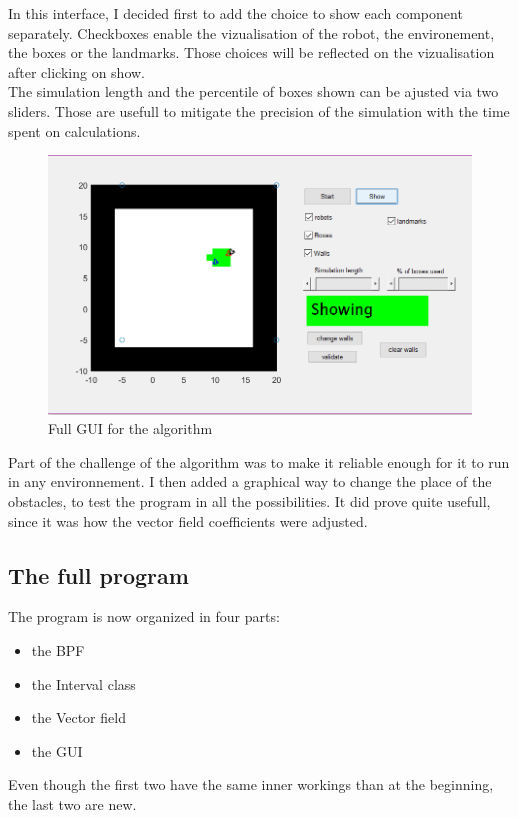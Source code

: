 In this interface, I decided first to add the choice to show each component separately. Checkboxes enable the vizualisation of the robot, the environement, the boxes or the landmarks.
Those choices will be reflected on the vizualisation after clicking on show.\\

The simulation length and the percentile of boxes shown can be ajusted via two sliders. Those are usefull to mitigate the precision of the simulation with the time spent on calculations.\\

\begin{figure}[H]
\centering
\includegraphics[scale=0.7]{Figures/Gui}
\decoRule
\caption[Gui]{Full GUI for the algorithm}
\label{fig:gui}
\end{figure}

Part of the challenge of the algorithm was to make it reliable enough for it to run in any environnement.
I then added a graphical way to change the place of the obstacles, to test the program in all the possibilities.
It did prove quite usefull, since it was how the vector field coefficients were adjusted.


\subsection{The full program}

The program is now organized in four parts:
\begin{itemize}
  \item the BPF
  \item the Interval class
  \item the Vector field
  \item the GUI
\end{itemize}
Even though the first two have the same inner workings than at the beginning, the last two are new.

